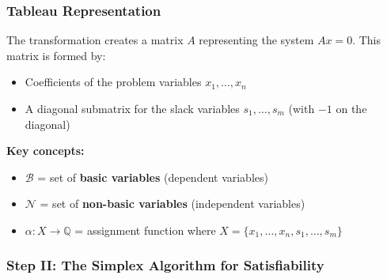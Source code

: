 \documentclass[11pt,a4paper]{article}
\theoremstyle{definition}
\theoremstyle{plain}
\theoremstyle{remark}
\begin{document}
\subsubsection{Tableau Representation}

The transformation creates a matrix $A$ representing the system $Ax = 0$. This matrix is formed by:
\begin{itemize}
    \item Coefficients of the problem variables $x_1, \ldots, x_n$
    \item A diagonal submatrix for the slack variables $s_1, \ldots, s_m$ (with $-1$ on the diagonal)
\end{itemize}

\textbf{Key concepts:}
\begin{itemize}
    \item $\mathcal{B}$ = set of \textbf{basic variables} (dependent variables)
    \item $\mathcal{N}$ = set of \textbf{non-basic variables} (independent variables)
    \item $\alpha: X \rightarrow \mathbb{Q}$ = assignment function where $X = \{x_1, \ldots, x_n, s_1, \ldots, s_m\}$
\end{itemize}

\subsubsection{Step II: The Simplex Algorithm for Satisfiability}
\end{document}
